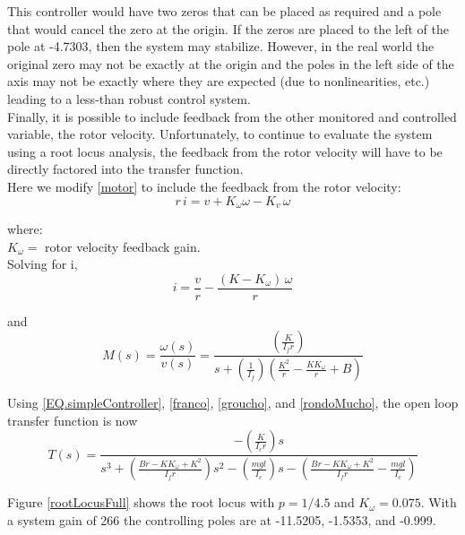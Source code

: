 \documentclass[12pt,letterpaper]{article}
\begin{document}
This controller would have two zeros that can be placed as required and a pole that would cancel
the zero at the origin.  If the zeros are placed to the left of the pole at -4.7303, then the system may stabilize.
However, in the real world the original zero may not be exactly at the origin and the poles in the left side of the axis may not be exactly where they are expected (due to nonlinearities, etc.) 
leading to a less-than robust control system. \\

Finally, it is possible to include feedback from the other monitored and controlled variable, the rotor velocity.
Unfortunately, to continue to evaluate the system using a root locus analysis, the feedback from
the rotor velocity will have to be directly factored into the transfer function.  \\

Here we modify \eqref{motor} to include the feedback from the rotor velocity:
\begin{equation}
    r \,i = v +K_{\omega}\omega - K_{v} \, \omega \label{motorUpdated}
\end{equation}

where: \\
$ K_{\omega} =$ rotor velocity feedback gain.\\

Solving for i,
\begin{equation}
    i = \frac{v}{r} - \frac{(K-K_{\omega}) \, \omega}{r}
\end{equation}

and
\begin{equation}
    M(s) = \frac{\omega(s)}{v(s)} =  \frac{\left(\frac{K} {I_{f}r}\right)}{s + (\frac{1}{I_{f}})(\frac{K^2}{r}-\frac{K K_{\omega}}{r}+B)}
    \label{rondoMucho}
\end{equation} 

Using \eqref{EQ.simpleController}, \eqref{franco}, \eqref{groucho}, and \eqref{rondoMucho}, the open loop transfer function is now
\begin{equation}
	T(s) =\frac{-(\frac{K} {I_{c}r})s}
	{s^3 + (\frac{B r-K K_{\omega}+K^2}{I_{f}r})s^2 - (\frac{m g l}{I_{c}})s - (\frac{Br-K K_{\omega}+K^2}{I_{f}r} - \frac{m g l}{I_{c}})}
\end{equation}

Figure \ref{rootLocusFull} shows the root locus with $p = 1/4.5$ and $K_{\omega} = 0.075$.  With a system gain of 266 the controlling poles are at -11.5205, -1.5353, and -0.999.\\
\end{document}

